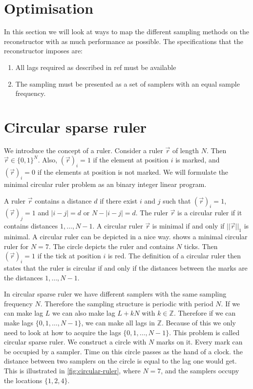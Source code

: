 \documentclass[a4paper, openany, oneside]{memoir}
\begin{document}
\section{Optimisation}
In this section we will look at ways to map the different sampling methods on the reconstructor with as much performance as possible. The specifications that the reconstructor imposes are:

\begin{enumerate}
\item All lags required as described in ref  must be available
\item The sampling must be presented as a set of samplers with an equal sample frequency.
\end{enumerate} 

\section{Circular sparse ruler}
We introduce the concept of a ruler. Consider a ruler $\vec{r}$ of length $N$. Then $\vec{r} \in \{0,1\}^N$. Also, $(\vec{r})_i = 1$ if the element at position $i$ is marked, and $(\vec{r})_i = 0$ if the elements at position is not marked. We will formulate the minimal circular ruler problem as an binary integer linear program.

A ruler $\vec{r}$ contains a distance $d$ if there exist $i$ and $j$ such that $(\vec{r})_i = 1$, $(\vec{r})_j = 1$ and $|i-j| = d$ or  $N-|i-j| = d$. The ruler $\vec{r}$ is a circular ruler if it contains distances $ 1, \ldots, N - 1$. A circular ruler $\vec{r}$ is minimal if and only if $||\vec{r}||_1$ is minimal. A circular ruler can be depicted in a nice way.  shows a minimal circular ruler for $N=7$. The circle depicts the ruler and contains $N$ ticks. Then $(\vec{r})_i = 1$ if the tick at position $i$ is red. The definition of a circular ruler then states that the ruler is circular if and only if the distances between the marks are the distances $1,\ldots,N-1$.

In circular sparse ruler we have different samplers with the same sampling frequency $N$. Therefore the sampling structure is periodic with  period $N$.
If we can make lag $L$ we can also make lag $L+kN$ with $k \in \mathbb{Z}$. Therefore if we can make lags $\{0,1,\dots,N-1\}$, we can make all lags in $\mathbb{Z}$. Because of this we only need to look at how to acquire the lags $\{0,1,\dots,N-1\}$. This problem is called circular sparse ruler. We construct a circle with $N$ marks on it. Every mark can be occupied by a sampler. Time on this circle passes as the hand of a clock. the distance between two samplers on the circle is equal to the lag one would get. This is illustrated in \cref{fig:circular-ruler}, where $N=7$, and the samplers occupy the locations $\{1,2,4\}$.
\end{document}
